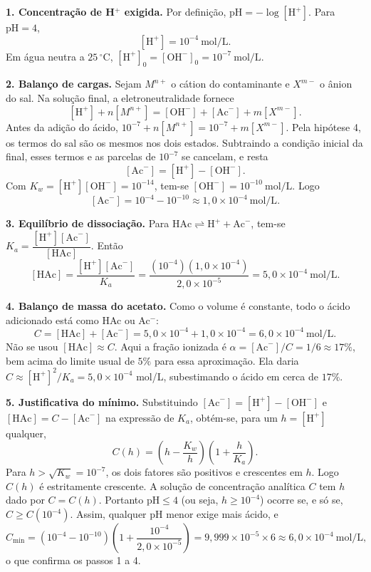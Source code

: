\documentclass{article}%
\begin{document}
\textbf{1. Concentração de H$^+$ exigida.} Por definição, $\text{pH} = -\log[\text{H}^+]$. Para $\text{pH} = 4$,
\[
[\text{H}^+] = 10^{-4}\ \text{mol/L}.
\]
Em água neutra a $25\,^{\circ}\text{C}$, $[\text{H}^+]_0 = [\text{OH}^-]_0 = 10^{-7}\ \text{mol/L}$.

\textbf{2. Balanço de cargas.} Sejam $M^{n+}$ o cátion do contaminante e $X^{m-}$ o ânion do sal. Na solução final, a eletroneutralidade fornece
\[
[\text{H}^+] + n[M^{n+}] = [\text{OH}^-] + [\text{Ac}^-] + m[X^{m-}].
\]
Antes da adição do ácido, $10^{-7} + n[M^{n+}] = 10^{-7} + m[X^{m-}]$. Pela hipótese 4, os termos do sal são os mesmos nos dois estados. Subtraindo a condição inicial da final, esses termos e as parcelas de $10^{-7}$ se cancelam, e resta
\[
[\text{Ac}^-] = [\text{H}^+] - [\text{OH}^-].
\]
Com $K_w = [\text{H}^+][\text{OH}^-] = 10^{-14}$, tem-se $[\text{OH}^-] = 10^{-10}\ \text{mol/L}$. Logo
\[
[\text{Ac}^-] = 10^{-4} - 10^{-10} \approx 1{,}0\times10^{-4}\ \text{mol/L}.
\]

\textbf{3. Equilíbrio de dissociação.} Para $\text{HAc} \rightleftharpoons \text{H}^+ + \text{Ac}^-$, tem-se $K_a = \dfrac{[\text{H}^+][\text{Ac}^-]}{[\text{HAc}]}$. Então
\[
[\text{HAc}] = \frac{[\text{H}^+][\text{Ac}^-]}{K_a} = \frac{(10^{-4})(1{,}0\times10^{-4})}{2{,}0\times10^{-5}} = 5{,}0\times10^{-4}\ \text{mol/L}.
\]

\textbf{4. Balanço de massa do acetato.} Como o volume é constante, todo o ácido adicionado está como HAc ou Ac$^-$:
\[
C = [\text{HAc}] + [\text{Ac}^-] = 5{,}0\times10^{-4} + 1{,}0\times10^{-4} = 6{,}0\times10^{-4}\ \text{mol/L}.
\]
Não se usou $[\text{HAc}] \approx C$. Aqui a fração ionizada é $\alpha = [\text{Ac}^-]/C = 1/6 \approx 17\%$, bem acima do limite usual de $5\%$ para essa aproximação. Ela daria $C \approx [\text{H}^+]^2/K_a = 5{,}0\times10^{-4}$ mol/L, subestimando o ácido em cerca de $17\%$.

\textbf{5. Justificativa do mínimo.} Substituindo $[\text{Ac}^-] = [\text{H}^+] - [\text{OH}^-]$ e $[\text{HAc}] = C - [\text{Ac}^-]$ na expressão de $K_a$, obtém-se, para um $h = [\text{H}^+]$ qualquer,
\[
C(h) = \left(h - \frac{K_w}{h}\right)\left(1 + \frac{h}{K_a}\right).
\]
Para $h > \sqrt{K_w} = 10^{-7}$, os dois fatores são positivos e crescentes em $h$. Logo $C(h)$ é estritamente crescente. A solução de concentração analítica $C$ tem $h$ dado por $C = C(h)$. Portanto $\text{pH} \le 4$ (ou seja, $h \ge 10^{-4}$) ocorre se, e só se, $C \ge C(10^{-4})$. Assim, qualquer pH menor exige mais ácido, e
\[
C_{\min} = \left(10^{-4} - 10^{-10}\right)\left(1 + \frac{10^{-4}}{2{,}0\times10^{-5}}\right) = 9{,}999\times10^{-5}\times 6 \approx 6{,}0\times10^{-4}\ \text{mol/L},
\]
o que confirma os passos 1 a 4.
\end{document}

